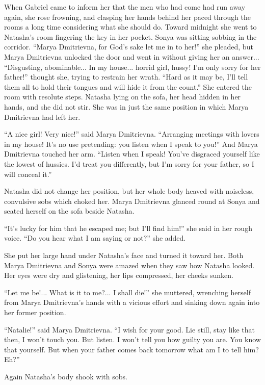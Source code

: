 When Gabriel came to inform her that the men who had come had run
away again, she rose frowning, and clasping her hands behind her
paced through the rooms a long time considering what she should
do. Toward midnight she went to Natasha's room fingering the key
in her pocket.  Sonya was sitting sobbing in the
corridor. ``Marya Dmitrievna, for God's sake let me in to her!''
she pleaded, but Marya Dmitrievna unlocked the door and went in
without giving her an answer... ``Disgusting, abominable... In my
house... horrid girl, hussy! I'm only sorry for her father!''
thought she, trying to restrain her wrath. ``Hard as it may be,
I'll tell them all to hold their tongues and will hide it from
the count.'' She entered the room with resolute steps. Natasha
lying on the sofa, her head hidden in her hands, and she did not
stir. She was in just the same position in which Marya Dmitrievna
had left her.

``A nice girl! Very nice!'' said Marya Dmitrievna. ``Arranging
meetings with lovers in my house! It's no use pretending: you
listen when I speak to you!'' And Marya Dmitrievna touched her
arm. ``Listen when I speak!  You've disgraced yourself like the
lowest of hussies. I'd treat you differently, but I'm sorry for
your father, so I will conceal it.''

Natasha did not change her position, but her whole body heaved
with noiseless, convulsive sobs which choked her. Marya
Dmitrievna glanced round at Sonya and seated herself on the sofa
beside Natasha.

``It's lucky for him that he escaped me; but I'll find him!'' she
said in her rough voice. ``Do you hear what I am saying or not?''
she added.

She put her large hand under Natasha's face and turned it toward
her.  Both Marya Dmitrievna and Sonya were amazed when they saw
how Natasha looked. Her eyes were dry and glistening, her lips
compressed, her cheeks sunken.

``Let me be!... What is it to me?... I shall die!'' she muttered,
wrenching herself from Marya Dmitrievna's hands with a vicious
effort and sinking down again into her former position.

``Natalie!'' said Marya Dmitrievna. ``I wish for your good. Lie
still, stay like that then, I won't touch you. But listen. I
won't tell you how guilty you are. You know that yourself. But
when your father comes back tomorrow what am I to tell him? Eh?''

Again Natasha's body shook with sobs.

